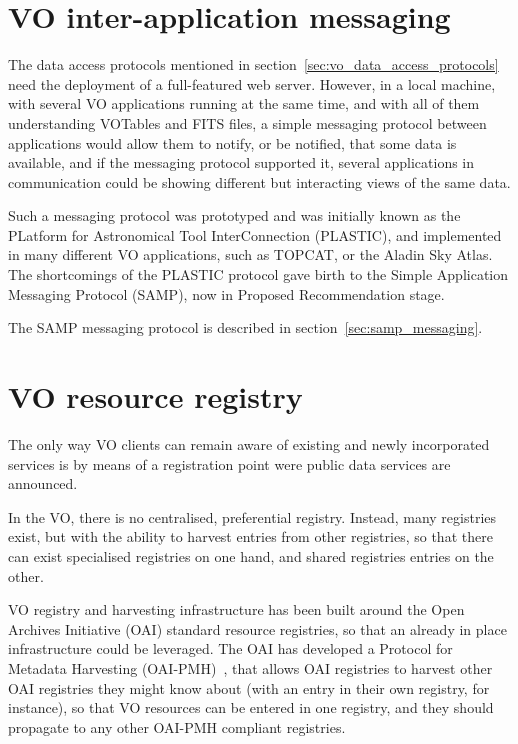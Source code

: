		


	\section{VO inter-application messaging} %
	\label{sec:vo_application_messaging}
	
		The data access protocols mentioned in
		section~\ref{sec:vo_data_access_protocols} need the
		deployment of a full-featured web server. However, in a
		local machine, with several VO applications running at the
		same time, and with all of them understanding VOTables and
		FITS files, a simple messaging protocol between
		applications would allow them to notify, or be notified,
		that some data is available, and if the messaging protocol
		supported it, several applications in communication could
		be showing different but interacting views of the same
		data.
		
		 Such a messaging protocol was prototyped and was initially
		known as the PLatform for Astronomical Tool InterConnection
		(PLASTIC), and implemented in many different VO
		applications, such as TOPCAT, or the Aladin Sky Atlas. The
		shortcomings of the PLASTIC protocol gave birth to the
		Simple Application Messaging Protocol (SAMP), now in
		Proposed Recommendation stage.
		
		 The SAMP messaging protocol is described in
		section~\ref{sec:samp_messaging}.
	
	
	\section{VO resource registry} %
	\label{sec:vo_resource_registry}
	
		The only way VO clients can remain aware of existing and
		newly incorporated services is by means of a registration
		point were public data services are announced.
		
		 In the VO, there is no centralised, preferential registry.
		Instead, many registries exist, but with the ability to
		harvest entries from other registries, so that there can
		exist specialised registries on one hand, and shared
		registries entries on the other.
		
		 VO registry and harvesting infrastructure has been built
		around the Open Archives
		Initiative (OAI)
		standard resource registries, so that an already in place
		infrastructure could be leveraged. The OAI has developed a
		Protocol for Metadata Harvesting
		(OAI-PMH)~\cite{2002OAI-PMH}, that allows OAI registries to
		harvest other OAI registries they might know about (with an
		entry in their own registry, for instance), so that VO
		resources can be entered in one registry, and they should
		propagate to any other OAI-PMH compliant registries.
		
